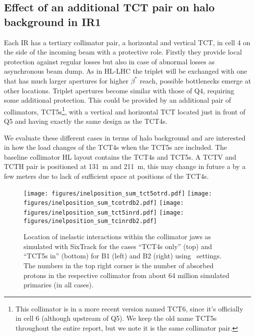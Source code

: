 
\subsection{Effect of an additional TCT pair on halo background in IR1}

Each IR has a tertiary collimator pair, a horizontal and vertical TCT, in cell 4 on the side of the incoming beam with a protective role. Firstly they provide local protection against regular losses but also in case of abnormal losses as asynchronous beam dump. As in HL-LHC the triplet will be exchanged with one that has much larger apertures for higher $\beta^*$ reach, possible bottlenecks emerge at other locations. Triplet apertures become similar with those of Q4, requiring some additional protection. This could be provided by an additional pair of collimators, TCT5s\footnote{This collimator is in a more recent version named TCT6, since it's officially in cell 6 (although upstream of Q5). We keep the old name TCT5s throughout the entire report, but we note it is the same collimator pair.}, with a vertical and horizontal TCT located just in front of Q5 and having exactly the same design as the TCT4s.

We evaluate these different cases in terms of halo background and are interested in how the load changes of the TCT4s when the TCT5s are included. The baseline collimator HL layout contains the TCT4s and TCT5s. A TCTV and TCTH pair is positioned at 131~m and 211~m, this may change in future a by a few meters due to lack of sufficient space at positions of the TCT4s.

\begin{figure}%
\begin{center}
\texttt{[image: figures/inelposition\_sum\_tct5otrd.pdf]}
\texttt{[image: figures/inelposition\_sum\_tcotrdb2.pdf]}
\texttt{[image: figures/inelposition\_sum\_tct5inrd.pdf]}
\texttt{[image: figures/inelposition\_sum\_tcinrdb2.pdf]}
\end{center}
\vspace{-0.6cm}
 \caption{Location of inelastic interactions within the collimator jaws as simulated with SixTrack for the cases ``TCT4s only'' (top) and ``TCT5s in'' (bottom) for B1 (left) and B2 (right) using \twosigmaret~settings. The numbers in the top right corner is the number of absorbed protons in the respective collimator from about 64 million simulated primaries (in all cases).
  \label{inelHLtctsInOut}}
\end{figure}

